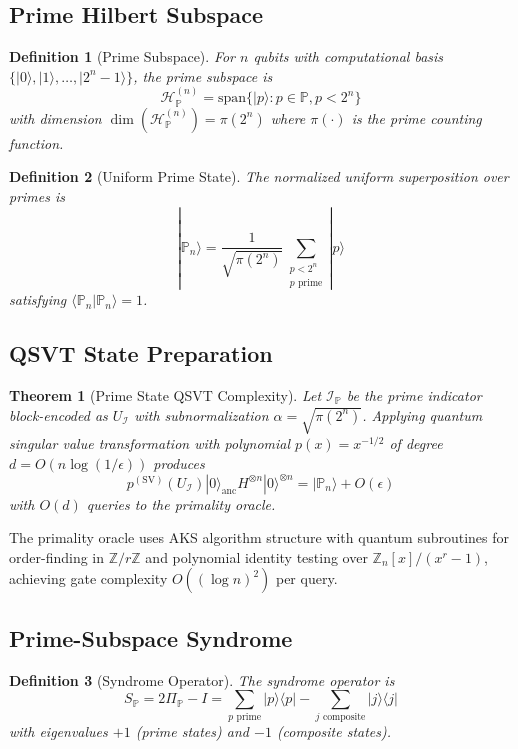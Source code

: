 \documentclass[11pt,letterpaper]{article}
\newtheorem{definition}{Definition}
\newtheorem{theorem}{Theorem}
\begin{document}
\subsection{Prime Hilbert Subspace}

\begin{definition}[Prime Subspace]
For $n$ qubits with computational basis $\{|0\rangle, |1\rangle, \ldots, |2^n-1\rangle\}$, the prime subspace is
\[
\mathcal{H}_{\mathbb{P}}^{(n)} = \text{span}\{|p\rangle : p \in \mathbb{P}, p < 2^n\}
\]
with dimension $\dim(\mathcal{H}_{\mathbb{P}}^{(n)}) = \pi(2^n)$ where $\pi(\cdot)$ is the prime counting function.
\end{definition}

\begin{definition}[Uniform Prime State]
The normalized uniform superposition over primes is
\[
|\mathbb{P}_n\rangle = \frac{1}{\sqrt{\pi(2^n)}} \sum_{\substack{p < 2^n \\ p \text{ prime}}} |p\rangle
\]
satisfying $\langle \mathbb{P}_n | \mathbb{P}_n \rangle = 1$.
\end{definition}

\subsection{QSVT State Preparation}

\begin{theorem}[Prime State QSVT Complexity]
Let $\mathcal{I}_{\mathbb{P}}$ be the prime indicator block-encoded as $U_{\mathcal{I}}$ with subnormalization $\alpha = \sqrt{\pi(2^n)}$. Applying quantum singular value transformation with polynomial $p(x) = x^{-1/2}$ of degree $d = O(n\log(1/\epsilon))$ produces
\[
p^{(\text{SV})}(U_{\mathcal{I}}) |0\rangle_{\text{anc}} H^{\otimes n}|0\rangle^{\otimes n} = |\mathbb{P}_n\rangle + O(\epsilon)
\]
with $O(d)$ queries to the primality oracle.
\end{theorem}

The primality oracle uses AKS algorithm structure with quantum subroutines for order-finding in $\mathbb{Z}/r\mathbb{Z}$ and polynomial identity testing over $\mathbb{Z}_n[x]/(x^r-1)$, achieving gate complexity $O((\log n)^2)$ per query.

\subsection{Prime-Subspace Syndrome}

\begin{definition}[Syndrome Operator]
The syndrome operator is
\[
S_{\mathbb{P}} = 2\Pi_{\mathbb{P}} - I = \sum_{p \text{ prime}} |p\rangle\langle p| - \sum_{j \text{ composite}} |j\rangle\langle j|
\]
with eigenvalues $+1$ (prime states) and $-1$ (composite states).
\end{definition}
\end{document}
